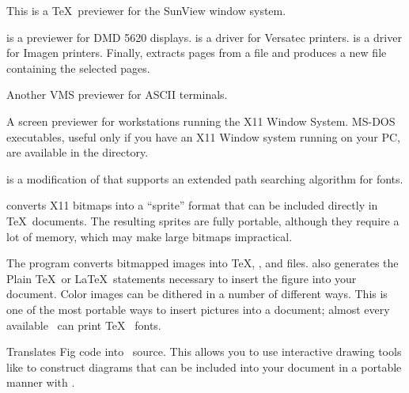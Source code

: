 

This is a \TeX\ previewer for the SunView window system.


 is a  previewer for DMD 5620 displays.
 is a  driver for Versatec printers.
 is a  driver for Imagen printers.  Finally,
 extracts pages from a  file and produces
a new  file containing the selected pages.

\newpage
{}

Another VMS  previewer for ASCII terminals.


A screen previewer for workstations running the X11 Window System.
MS-DOS executables, useful only if you have an X11 Window system running
on your PC, are available in the  directory.


 is a modification of  that
supports an extended path searching algorithm for  fonts.


 converts X11  bitmaps into a ``sprite'' format
that can be included directly in \TeX\ documents.  The resulting sprites
are fully portable, although they require a lot of memory, which may make
large bitmaps impractical.


The  program converts bitmapped images into \TeX,
, and  files.  
 also generates the Plain \TeX\ or
\LaTeX\ statements necessary to insert the figure into your document.
Color images can be dithered in a number of different ways.  This
is one of the most portable ways to insert pictures into a document;
almost every available \dvidriver\ can print \TeX\  fonts.


Translates Fig code into \MF\ source.  This allows you to use interactive
drawing tools like  to construct diagrams that can be
included into your document in a portable manner with .

